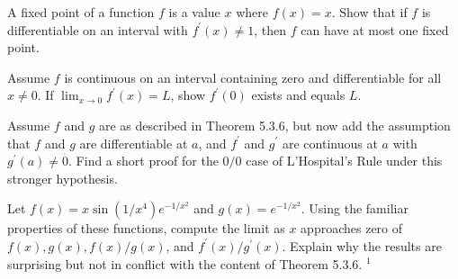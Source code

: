 \begin{exercise}
\end{exercise}
\begin{solution}
  \TODO
\end{solution}

\begin{exercise}
  A fixed point of a function $f$ is a value $x$ where $f(x)=x$. Show that if $f$ is differentiable on an interval with $f^{\prime}(x) \neq 1$, then $f$ can have at most one fixed point.
\end{exercise}
\begin{solution}
  \TODO
\end{solution}

\begin{exercise}
  Assume $f$ is continuous on an interval containing zero and differentiable for all $x \neq 0$. If $\lim _{x \rightarrow 0} f^{\prime}(x)=L$, show $f^{\prime}(0)$ exists and equals $L$.
\end{exercise}
\begin{solution}
  \TODO
\end{solution}

\begin{exercise}
  Assume $f$ and $g$ are as described in Theorem 5.3.6, but now add the assumption that $f$ and $g$ are differentiable at $a$, and $f^{\prime}$ and $g^{\prime}$ are continuous at $a$ with $g^{\prime}(a) \neq 0$. Find a short proof for the $0 / 0$ case of L'Hospital's Rule under this stronger hypothesis.
\end{exercise}
\begin{solution}
  \TODO
\end{solution}

\begin{exercise}
  Let $f(x)=x \sin \left(1 / x^{4}\right) e^{-1 / x^{2}}$ and $g(x)=e^{-1 / x^{2}}$. Using the familiar properties of these functions, compute the limit as $x$ approaches zero of $f(x), g(x), f(x) / g(x)$, and $f^{\prime}(x) / g^{\prime}(x)$. Explain why the results are surprising but not in conflict with the content of Theorem 5.3.6. ${ }^{1}$
\end{exercise}
\begin{solution}
  \TODO
\end{solution}

